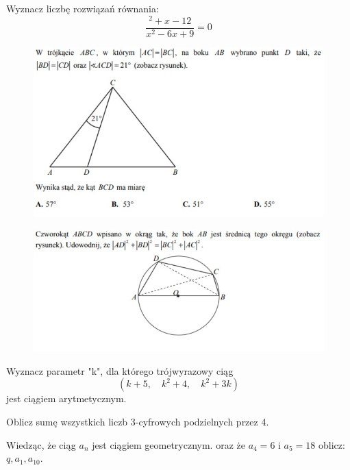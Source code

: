 \documentclass[12pt,a4paper]{article}
\theoremstyle{break}
\begin{document}
	\begin{zad}
		Wyznacz liczbę rozwiązań równania:
		$$\frac{^2+x-12}{x^2-6x+9}=0$$
	\end{zad}
	\begin{zad}
	\end{zad}
	\begin{figure}[h]
		\centering
		\includegraphics[scale=0.7]{z1.jpeg}
	\end{figure}
	\begin{zad}
	\end{zad}
	\begin{figure}[h]
		\centering
		\includegraphics[scale=0.7]{z2.jpeg}
	\end{figure}	
	\begin{zad}
		Wyznacz parametr "k", dla którego trójwyrazowy ciąg
		$$(k+5,\quad k^2+4, \quad k^2+3k)$$
		jest ciągiem arytmetycznym. 
	\end{zad}
	\begin{zad}
		Oblicz sumę wszystkich liczb 3-cyfrowych podzielnych przez 4.
	\end{zad}
	\begin{zad}
		Wiedząc, że ciąg $a_n$ jest ciągiem geometrycznym. oraz że $a_4=6$ i $a_5=18$ oblicz: $q,a_1,a_{10}$.
	\end{zad}
\end{document}
